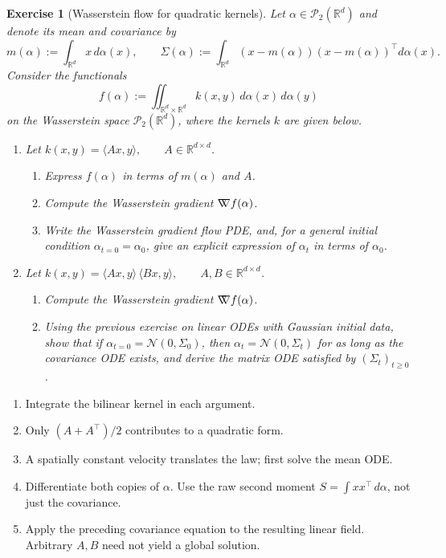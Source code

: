 \documentclass[11pt,a4paper]{article}
\theoremstyle{exostyle}
\newtheorem{exercise}{Exercise}
\newcommand{\R}{\mathbb{R}}
\newcommand{\ip}[2]{\langle #1,#2\rangle}
\newcommand{\gradW}{\mathord{\nabla\mkern-9.3mu\nabla}}
\begin{document}
\begin{exercise}[Wasserstein flow for quadratic kernels]\label{ex:wasserstein-kernels}
Let $\alpha \in \mathcal{P}_2(\R^d)$ and denote its mean and covariance by
\[
m(\alpha) := \int_{\R^d} x \, d\alpha(x),
\qquad
\Sigma(\alpha) := \int_{\R^d} (x-m(\alpha))(x-m(\alpha))^\top d\alpha(x).
\]
Consider the functionals
\[
f(\alpha) := \iint_{\R^d\times\R^d} k(x,y)\,d\alpha(x)\,d\alpha(y)
\]
on the Wasserstein space $\mathcal P_2(\R^d)$, where the kernels $k$ are given below.

\begin{enumerate}[label=\textbf{(\arabic*)}]
  \item Let $k(x,y) = \ip{A x}{y}, \qquad A \in \R^{d\times d}$.
  \begin{enumerate}[label=\textbf{(\alph*)}]
    \item Express $f(\alpha)$ in terms of $m(\alpha)$ and $A$.
    \item Compute the Wasserstein gradient $\gradW f(\alpha)$.
    \item Write the Wasserstein gradient flow PDE,
    and, for a general initial condition $\alpha_{t=0} = \alpha_0$, give an explicit expression of $\alpha_t$ in terms of $\alpha_0$.
  \end{enumerate}

  \item Let
  $k(x,y) = \ip{A x}{y}\,\ip{B x}{y}, \qquad A,B \in \R^{d\times d}$.
  \begin{enumerate}[label=\textbf{(\alph*)}]
    \item Compute the Wasserstein gradient $\gradW f(\alpha)$.
    \item Using the previous exercise on linear ODEs with Gaussian initial data, show that if
$\alpha_{t=0} = \mathcal{N}(0,\Sigma_0)$,
    then $\alpha_t = \mathcal{N}(0,\Sigma_t)$ for as long as the covariance ODE exists, and derive the matrix ODE satisfied by $(\Sigma_t)_{t\ge 0}$.
  \end{enumerate}
\end{enumerate}
\end{exercise}
\begin{hints}
\begin{enumerate}[label=(\arabic*)]\item[(1a)] Integrate the bilinear kernel in each argument.\item[(1b)] Only $(A+A^\top)/2$ contributes to a quadratic form.\item[(1c)] A spatially constant velocity translates the law; first solve the mean ODE.\item[(2a)] Differentiate both copies of $\alpha$. Use the raw second moment $S=\int xx^\top\,d\alpha$, not just the covariance.\item[(2b)] Apply the preceding covariance equation to the resulting linear field. Arbitrary $A,B$ need not yield a global solution.\end{enumerate}
\end{hints}
\end{document}

